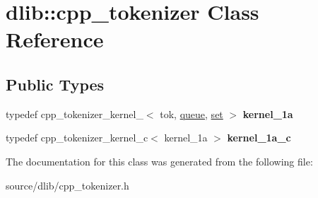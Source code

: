 \hypertarget{classdlib_1_1cpp__tokenizer}{
\section{dlib::cpp\_\-tokenizer Class Reference}
\label{classdlib_1_1cpp__tokenizer}
}
\subsection*{Public Types}
\begin{DoxyCompactItemize}
\item 
\hypertarget{classdlib_1_1cpp__tokenizer_aeb168845b30615d7d8357e3eb315cf33}{
typedef cpp\_\-tokenizer\_\-kernel\_$<$ tok, \hyperlink{classdlib_1_1queue}{queue}, \hyperlink{classdlib_1_1set}{set} $>$ {\bfseries kernel\_\-1a}}
\label{classdlib_1_1cpp__tokenizer_aeb168845b30615d7d8357e3eb315cf33}

\item 
\hypertarget{classdlib_1_1cpp__tokenizer_a2221cf04db85bd58335601bd6ddd2cc7}{
typedef cpp\_\-tokenizer\_\-kernel\_\-c$<$ kernel\_\-1a $>$ {\bfseries kernel\_\-1a\_\-c}}
\label{classdlib_1_1cpp__tokenizer_a2221cf04db85bd58335601bd6ddd2cc7}

\end{DoxyCompactItemize}


The documentation for this class was generated from the following file:\begin{DoxyCompactItemize}
\item 
source/dlib/cpp\_\-tokenizer.h\end{DoxyCompactItemize}
